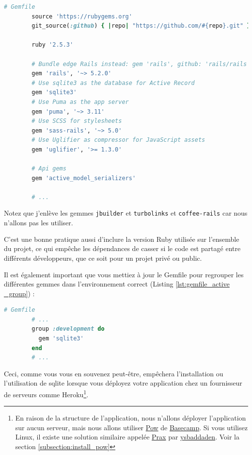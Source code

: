 \documentclass[]{report}
\begin{document}
        \begin{scriptsize}
        \begin{lstlisting}[language=ruby, caption={Le Gemfile par défaut avec la Gem des sérialiseurs.}, label={listing:gemfile_active _model_serializers}, breaklines]
        # Gemfile
        source 'https://rubygems.org'
        git_source(:github) { |repo| "https://github.com/#{repo}.git" }

        ruby '2.5.3'

        # Bundle edge Rails instead: gem 'rails', github: 'rails/rails'
        gem 'rails', '~> 5.2.0'
        # Use sqlite3 as the database for Active Record
        gem 'sqlite3'
        # Use Puma as the app server
        gem 'puma', '~> 3.11'
        # Use SCSS for stylesheets
        gem 'sass-rails', '~> 5.0'
        # Use Uglifier as compressor for JavaScript assets
        gem 'uglifier', '>= 1.3.0'

        # Api gems
        gem 'active_model_serializers'

        # ...
        \end{lstlisting}
        \end{scriptsize}

        Notez que j'enlève les gemmes \verb|jbuilder| et \verb|turbolinks| et \verb|coffee-rails| car nous n'allons pas les utiliser.

        C'est une bonne pratique aussi d'inclure la version Ruby utilisée sur l'ensemble du projet, ce qui empêche les dépendances de casser si le code est partagé entre différents développeurs, que ce soit pour un projet privé ou public.

        Il est également important que vous mettiez à jour le Gemfile pour regrouper les différentes gemmes dans l'environnement correct (Listing \ref{lst:gemfile_active _group}) :

        \begin{scriptsize}
        \begin{lstlisting}[language=ruby, caption={Le Gemfile mis à jour pour différents groupes.}, label={lst:gemfile_active _group}]
        # Gemfile
        # ...
        group :development do
          gem 'sqlite3'
        end
        # ...
        \end{lstlisting}
        \end{scriptsize}

        Ceci, comme vous vous en souvenez peut-être, empêchera l'installation ou l'utilisation de sqlite lorsque vous déployez votre application chez un fournisseur de serveurs comme Heroku\footnote{En raison de la structure de l'application, nous n'allons déployer l'application sur aucun serveur, mais nous allons utiliser \href{http://pow.cx/}{Pow} de \href{https://basecamp.com/}{Basecamp}. Si vous utilisez Linux, il existe une solution similaire appelée \href{https://github.com/ysbaddaden/prax.cr}{Prax} par \href{https://github.com/ysbaddaden}{ysbaddaden}. Voir la section \ref{subsection:install_pow}}.
\end{document}
